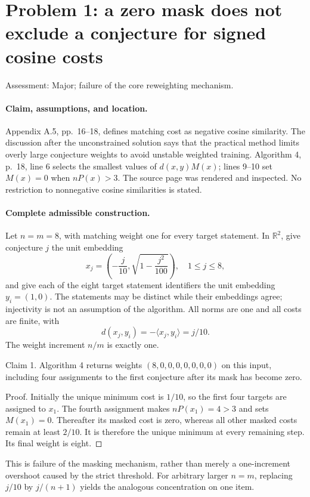 \documentclass[10pt]{article}
\begin{document}
\section*{Problem 1: a zero mask does not exclude a conjecture for signed cosine costs}
Assessment: Major; failure of the core reweighting mechanism.\par
\paragraph*{Claim, assumptions, and location.}\mbox{}\par
Appendix A.5, pp. 16–18, defines matching cost as negative cosine similarity. The discussion after the unconstrained solution says that the practical method limits overly large conjecture weights to avoid unstable weighted training. Algorithm 4, p. 18, line 6 selects the smallest values of \(d(x,y)M(x)\); lines 9–10 set \(M(x)=0\) when \(nP(x)>3\). The source page was rendered and inspected. No restriction to nonnegative cosine similarities is stated.\par
\paragraph*{Complete admissible construction.}\mbox{}\par
Let \(n=m=8\), with matching weight one for every target statement. In \(\mathbb R^2\), give conjecture \(j\) the unit embedding \[x_j=\left(-\frac{j}{10},\sqrt{1-\frac{j^2}{100}}\right),\quad 1\le j\le8,\] and give each of the eight target statement identifiers the unit embedding \(y_i=(1,0)\). The statements may be distinct while their embeddings agree; injectivity is not an assumption of the algorithm. All norms are one and all costs are finite, with \[d(x_j,y_i)=-\langle x_j,y_i\rangle=j/10.\] The weight increment \(n/m\) is exactly one.\par
Claim 1.  Algorithm 4 returns weights \((8,0,0,0,0,0,0,0)\) on this input, including four assignments to the first conjecture after its mask has become zero.\par
Proof. Initially the unique minimum cost is \(1/10\), so the first four targets are assigned to \(x_1\). The fourth assignment makes \(nP(x_1)=4>3\) and sets \(M(x_1)=0\). Thereafter its masked cost is zero, whereas all other masked costs remain at least \(2/10\). It is therefore the unique minimum at every remaining step. Its final weight is eight. ◻\par
This is failure of the masking mechanism, rather than merely a one-increment overshoot caused by the strict threshold. For arbitrary larger \(n=m\), replacing \(j/10\) by \(j/(n+1)\) yields the analogous concentration on one item.\par
\end{document}
